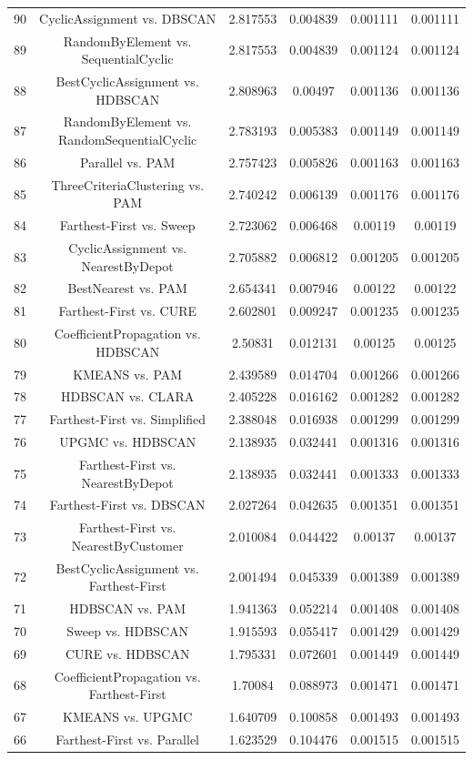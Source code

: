 \documentclass[a4paper,10pt]{article}
\begin{document}
\begin{landscape}
\begin{table}[!htp]
\begin{tabular}{cccccc}
90&CyclicAssignment vs. DBSCAN&2.817553&0.004839&0.001111&0.001111\\
89&RandomByElement vs. SequentialCyclic&2.817553&0.004839&0.001124&0.001124\\
88&BestCyclicAssignment vs. HDBSCAN&2.808963&0.00497&0.001136&0.001136\\
87&RandomByElement vs. RandomSequentialCyclic&2.783193&0.005383&0.001149&0.001149\\
86&Parallel vs. PAM&2.757423&0.005826&0.001163&0.001163\\
85&ThreeCriteriaClustering vs. PAM&2.740242&0.006139&0.001176&0.001176\\
84&Farthest-First vs. Sweep&2.723062&0.006468&0.00119&0.00119\\
83&CyclicAssignment vs. NearestByDepot&2.705882&0.006812&0.001205&0.001205\\
82&BestNearest vs. PAM&2.654341&0.007946&0.00122&0.00122\\
81&Farthest-First vs. CURE&2.602801&0.009247&0.001235&0.001235\\
80&CoefficientPropagation vs. HDBSCAN&2.50831&0.012131&0.00125&0.00125\\
79&KMEANS vs. PAM&2.439589&0.014704&0.001266&0.001266\\
78&HDBSCAN vs. CLARA&2.405228&0.016162&0.001282&0.001282\\
77&Farthest-First vs. Simplified&2.388048&0.016938&0.001299&0.001299\\
76&UPGMC vs. HDBSCAN&2.138935&0.032441&0.001316&0.001316\\
75&Farthest-First vs. NearestByDepot&2.138935&0.032441&0.001333&0.001333\\
74&Farthest-First vs. DBSCAN&2.027264&0.042635&0.001351&0.001351\\
73&Farthest-First vs. NearestByCustomer&2.010084&0.044422&0.00137&0.00137\\
72&BestCyclicAssignment vs. Farthest-First&2.001494&0.045339&0.001389&0.001389\\
71&HDBSCAN vs. PAM&1.941363&0.052214&0.001408&0.001408\\
70&Sweep vs. HDBSCAN&1.915593&0.055417&0.001429&0.001429\\
69&CURE vs. HDBSCAN&1.795331&0.072601&0.001449&0.001449\\
68&CoefficientPropagation vs. Farthest-First&1.70084&0.088973&0.001471&0.001471\\
67&KMEANS vs. UPGMC&1.640709&0.100858&0.001493&0.001493\\
66&Farthest-First vs. Parallel&1.623529&0.104476&0.001515&0.001515\\

\end{tabular}
\end{table}
\end{landscape}
\end{document}
